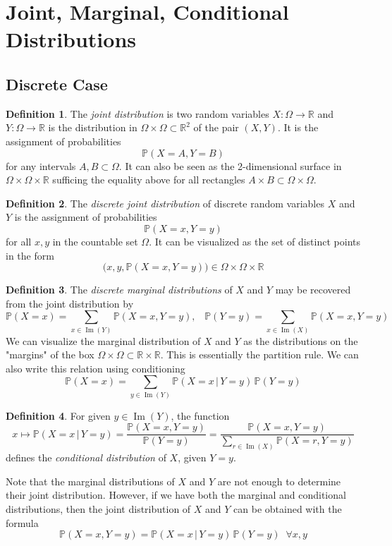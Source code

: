 \documentclass{article}
\DeclareMathOperator{\im}{Im}
\theoremstyle{remark}
\theoremstyle{definition}
\newtheorem{definition}{Definition}[section]
\begin{document}
\section{Joint, Marginal, Conditional Distributions}
\subsection{Discrete Case}
\begin{definition}
The \textit{joint distribution} is two random variables $X: \Omega \longrightarrow \mathbb{R}$ and $Y: \Omega \longrightarrow \mathbb{R}$ is the distribution in $\Omega \times \Omega \subset \mathbb{R}^2$ of the pair $(X, Y)$. It is the assignment of probabilities 
\[\mathbb{P}(X = A, Y = B)\]
for any intervals $A, B \subset \Omega$. It can also be seen as the 2-dimensional surface in $\Omega \times \Omega \times \mathbb{R}$ sufficing the equality above for all rectangles $A \times B \subset \Omega \times \Omega$. 
\end{definition}

\begin{definition}
The \textit{discrete joint distribution} of discrete random variables $X$ and $Y$ is the assignment of probabilities 
\[\mathbb{P}(X = x, Y = y)\]
for all $x, y$ in the countable set $\Omega$. It can be visualized as the set of distinct points in the form
\[\big(x, y, \mathbb{P}(X = x, Y = y) \big) \in \Omega \times \Omega \times \mathbb{R}\]
\end{definition}

\begin{definition}
The \textit{discrete marginal distributions} of $X$ and $Y$ may be recovered from the joint distribution by 
\[\mathbb{P}(X=x) = \sum_{x \in \im(Y)} \mathbb{P}(X =x, Y=y), \;\;\; \mathbb{P}(Y=y) = \sum_{x \in \im(X)} \mathbb{P}(X=x, Y=y)\]
We can visualize the marginal distribution of $X$ and $Y$ as the distributions on the "margins" of the box $\Omega \times \Omega \subset \mathbb{R} \times \mathbb{R}$. This is essentially the partition rule. We can also write this relation using conditioning
\[\mathbb{P}(X = x) = \sum_{y \in \im(Y)} \mathbb{P}(X=x \, | \, Y=y) \, \mathbb{P}(Y = y)\]
\end{definition}

\begin{definition}
For given $y \in \im(Y)$, the function 
\[x \mapsto \mathbb{P}(X = x \, | \, Y = y) = \frac{\mathbb{P}(X=x, Y=y)}{\mathbb{P}(Y=y)} = \frac{\mathbb{P}(X=x, Y=y)}{\sum_{r \in \im(X)} \mathbb{P}(X=r, Y=y)}\]
defines the \textit{conditional distribution} of $X$, given $Y = y$. 

Note that the marginal distributions of $X$ and $Y$ are not enough to determine their joint distribution. However, if we have both the marginal and conditional distributions, then the joint distribution of $X$ and $Y$ can be obtained with the formula 
\[\mathbb{P}(X = x, Y = y) = \mathbb{P}(X = x \,|\, Y = y) \, \mathbb{P}(Y=y) \;\; \forall x, y\]
\end{definition}
\end{document}
